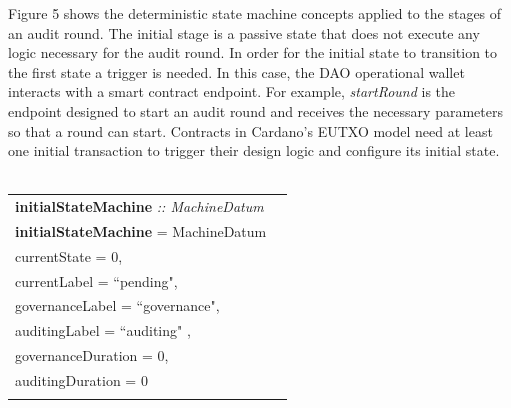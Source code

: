 \documentclass[9pt]{article}
\begin{document}
Figure 5 shows the deterministic state machine concepts applied to the stages of an audit round. The initial stage is a passive state that does not execute any logic necessary for the audit round. In order for the initial state to transition to the first state a trigger is needed. In this case, the DAO operational wallet interacts with a smart contract endpoint. For example, \emph{startRound} is the endpoint designed to start an audit round and receives the necessary parameters so that a round can start. Contracts in Cardano's EUTXO model need at least one initial transaction to trigger their design logic and configure its initial state.
\\
\\
\begin{tabular}{lr}
\textbf{initialStateMachine} \emph{:: MachineDatum}\\
\textbf{initialStateMachine}  = MachineDatum  \textbraceleft{}
\\ \hspace{60mm}currentState = 0, 
\\ \hspace{60mm}currentLabel = ``pending",
\\ \hspace{60mm}governanceLabel = ``governance",
\\ \hspace{60mm}auditingLabel = ``auditing" ,
\\ \hspace{60mm}governanceDuration = 0,
\\ \hspace{60mm}auditingDuration = 0
\\\hspace{60mm}\textbraceright{} 
\end{tabular}
\\
\\
\end{document}
